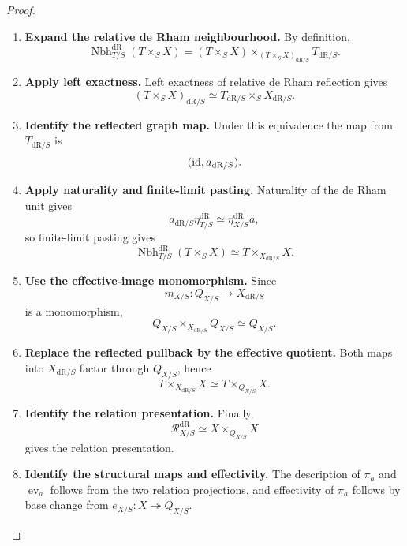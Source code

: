 \begin{proof}
\leavevmode
\begin{enumerate}[label=\textup{(\arabic*)}]
    \item \textbf{Expand the relative de Rham neighbourhood.}
By definition,
\[
  \operatorname{Nbh}^{\mathrm{dR}}_{T/S}(T\times_SX)
  =
  (T\times_SX)
  \times_{(T\times_SX)_{\mathrm{dR}/S}}
  T_{\mathrm{dR}/S}.
\]

    \item \textbf{Apply left exactness.}
Left exactness of relative de Rham reflection gives
\[
  (T\times_SX)_{\mathrm{dR}/S}
  \simeq
  T_{\mathrm{dR}/S}\times_SX_{\mathrm{dR}/S}.
\]

    \item \textbf{Identify the reflected graph map.}
Under this equivalence the map from \(T_{\mathrm{dR}/S}\) is
\[
  (\operatorname{id},a_{\mathrm{dR}/S}).
\]

    \item \textbf{Apply naturality and finite-limit pasting.}
Naturality of the de Rham unit gives
\[
  a_{\mathrm{dR}/S}\eta_{T/S}^{\mathrm{dR}}
  \simeq
  \eta_{X/S}^{\mathrm{dR}}a,
\]
so finite-limit pasting gives
\[
  \operatorname{Nbh}^{\mathrm{dR}}_{T/S}(T\times_SX)
  \simeq
  T\times_{X_{\mathrm{dR}/S}}X.
\]

    \item \textbf{Use the effective-image monomorphism.}
Since
\[
  m_{X/S}:Q_{X/S}\longrightarrow X_{\mathrm{dR}/S}
\]
is a monomorphism,
\[
  Q_{X/S}\times_{X_{\mathrm{dR}/S}}Q_{X/S}
  \simeq
  Q_{X/S}.
\]

    \item \textbf{Replace the reflected pullback by the effective quotient.}
Both maps into \(X_{\mathrm{dR}/S}\) factor through \(Q_{X/S}\), hence
\[
  T\times_{X_{\mathrm{dR}/S}}X
  \simeq
  T\times_{Q_{X/S}}X.
\]

    \item \textbf{Identify the relation presentation.}
Finally,
\[
  \mathcal R^{\mathrm{dR}}_{X/S}
  \simeq
  X\times_{Q_{X/S}}X
\]
gives the relation presentation.

    \item \textbf{Identify the structural maps and effectivity.}
The description of \(\pi_a\) and
\(\operatorname{ev}_a\) follows from the two relation projections, and
effectivity of \(\pi_a\) follows by base change from
\(e_{X/S}:X\twoheadrightarrow Q_{X/S}\).
\end{enumerate}
\end{proof}

